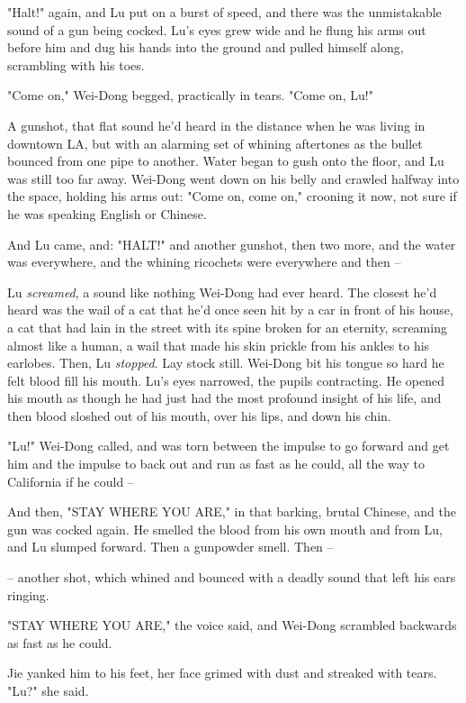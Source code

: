"Halt!" again, and Lu put on a burst of speed, and there was the
unmistakable sound of a gun being cocked. Lu's eyes grew wide and
he flung his arms out before him and dug his hands into the ground
and pulled himself along, scrambling with his toes.

"Come on," Wei-Dong begged, practically in tears. "Come on, Lu!"

A gunshot, that flat sound he'd heard in the distance when he was
living in downtown LA, but with an alarming set of whining
aftertones as the bullet bounced from one pipe to another. Water
began to gush onto the floor, and Lu was still too far away.
Wei-Dong went down on his belly and crawled halfway into the space,
holding his arms out: "Come on, come on," crooning it now, not sure
if he was speaking English or Chinese.

And Lu came, and: "HALT!" and another gunshot, then two more, and
the water was everywhere, and the whining ricochets were everywhere
and then --

Lu \emph{screamed}, a sound like nothing Wei-Dong had ever heard.
The closest he'd heard was the wail of a cat that he'd once seen
hit by a car in front of his house, a cat that had lain in the
street with its spine broken for an eternity, screaming almost like
a human, a wail that made his skin prickle from his ankles to his
earlobes. Then, Lu \emph{stopped}. Lay stock still. Wei-Dong bit
his tongue so hard he felt blood fill his mouth. Lu's eyes
narrowed, the pupils contracting. He opened his mouth as though he
had just had the most profound insight of his life, and then blood
sloshed out of his mouth, over his lips, and down his chin.

"Lu!" Wei-Dong called, and was torn between the impulse to go
forward and get him and the impulse to back out and run as fast as
he could, all the way to California if he could --

And then, "STAY WHERE YOU ARE," in that barking, brutal Chinese,
and the gun was cocked again. He smelled the blood from his own
mouth and from Lu, and Lu slumped forward. Then a gunpowder smell.
Then --

-- another shot, which whined and bounced with a deadly sound that
left his ears ringing.

"STAY WHERE YOU ARE," the voice said, and Wei-Dong scrambled
backwards as fast as he could.

Jie yanked him to his feet, her face grimed with dust and streaked
with tears. "Lu?" she said.

